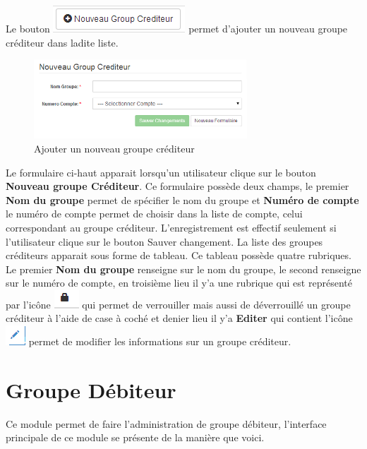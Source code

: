 \documentclass[12pt,a4paper]{report}
\begin{document}
Le bouton \includegraphics[scale=0.7]{pic/NewGroupCredit.png} permet d'ajouter un nouveau groupe créditeur dans ladite liste.

\begin{figure}[h]
\begin{center}
\includegraphics[width=8cm]{pic/AddNewGroupCred.png}
\end{center}
\caption{Ajouter un nouveau groupe créditeur}
\label{Ajouter un nouveau groupe créditeur}
\end{figure}

Le formulaire ci-haut apparait lorsqu'un utilisateur clique sur le bouton \textbf{Nouveau groupe Créditeur}. Ce formulaire possède deux champs, le premier \textbf{Nom du groupe} permet de spécifier le nom du groupe et \textbf{Numéro de compte}  le numéro de compte permet de choisir dans la liste de compte, celui correspondant au groupe créditeur.
L'enregistrement est effectif seulement si l'utilisateur clique sur le bouton Sauver changement.
La liste des groupes créditeurs apparait sous forme de tableau. Ce tableau possède quatre rubriques. Le premier \textbf{Nom du groupe} renseigne sur le nom du groupe, le second renseigne sur le numéro de compte, en troisième lieu il y'a une rubrique qui est représenté par l'icône \includegraphics[scale=0.7]{pic/Locked.png}  qui permet de verrouiller mais aussi de déverrouillé un groupe créditeur à l'aide de case à coché et denier lieu il y'a \textbf{Editer} qui contient l'icône  \includegraphics[scale=0.7]{pic/EditUser.png} permet de modifier les informations sur un groupe créditeur.

\newpage
\section{Groupe Débiteur}
Ce module permet de faire l'administration de groupe débiteur, l'interface principale de ce module se présente de la manière que voici.
\end{document}
